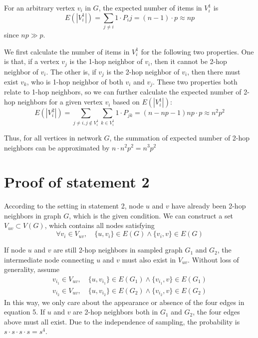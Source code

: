 \documentclass{article}
\begin{document}
For an arbitrary vertex $v_i$ in $G$, the expected number of items in $V_i^1$ is
\begin{equation}
    E(|V_i^1|)=\sum_{j\neq i}1\cdot P_ij=(n-1)\cdot p \approx np
\end{equation}
since $np\gg p$.

We first calculate the number of items in $V_i^1$ for the following two properties. One is that, if a vertex $v_j$ is the 1-hop neighbor of $v_i$, then it cannot be 2-hop neighbor of $v_i$. The other is, if $v_j$ is the 2-hop neighbor of $v_i$, then there must exist $v_k$, who is 1-hop neighbor of both $v_i$ and $v_j$. These two properties both relate to 1-hop neighbors, so we can further calculate the expected number of 2-hop neighbors for a given vertex $v_i$ based on $E(|V_i^1|)$:
\begin{equation}
    E(|V_i^2|)=\sum_{j\neq i, j\notin V_i^1}\sum_{k\in V_i^1}1\cdot P_{jk}=(n-np-1)np\cdot p\approx n^2p^2
\end{equation}

Thus, for all vertices in network $G$, the summation of expected number of 2-hop neighbors can be approximated by $n\cdot n^2p^2=n^3p^2$

\section*{Proof of statement 2}
According to the setting in statement 2, node $u$ and $v$ have already been 2-hop neighbors in graph $G$, which is the given condition. We can construct a set $V_{uv}\subset V(G)$, which contains all nodes satisfying
\begin{equation}
    \forall v_i\in V_{uv},\quad \{u,v_i\}\in E(G) \land  \{v_i,v\}\in E(G)
\end{equation}

If node $u$ and $v$ are still 2-hop neighbors in sampled graph $G_1$ and $G_2$, the intermediate node connecting $u$ and $v$ must also exist in $V_{uv}$. Without loss of generality, assume
\begin{equation}
    \begin{aligned}
    v_{i_1}\in V_{uv},\quad \{u,v_{i_1}\}\in E(G_1) \land  \{v_{i_1},v\}\in E(G_1) \\
    v_{i_2}\in V_{uv},\quad \{u,v_{i_2}\}\in E(G_2) \land  \{v_{i_2},v\}\in E(G_2)
    \end{aligned}
\end{equation}
In this way, we only care about the appearance or absence of the four edges in equation 5. If $u$ and $v$ are 2-hop neighbors both in $G_1$ and $G_2$, the four edges above must all exist. Due to the independence of sampling, the probability is $s\cdot s\cdot s\cdot s=s^4$.
\end{document}
